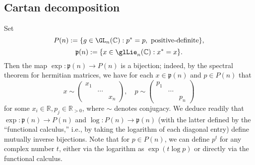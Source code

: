 \documentclass[reqno]{amsart} 
\begin{document}
\subsection{Cartan decomposition}\label{sec:cartan-decomposition}
Set
\begin{equation*}
  P(n) := \{g \in \GL_n(\mathbb{C}) : p^* = p, \text{ positive-definite} \},
\end{equation*}
\begin{equation*}
  \mathfrak{p}(n) := \{x \in \glLie_n(\mathbb{C}) : x^* = x \}.
\end{equation*}
Then the map $\exp : \mathfrak{p}(n) \rightarrow P(n)$ is a bijection; indeed, by the spectral theorem for hermitian matrices, we have for each $x \in \mathfrak{p}(n)$ and $p \in P(n)$ that
\begin{equation*}
  x \sim
  \begin{pmatrix}
    x_1 &  &  \\
    & \dotsb  &  \\
    & & x_n
  \end{pmatrix}
, \quad p \sim
  \begin{pmatrix}
    p_1 &  &  \\
    & \dotsb  &  \\
    & & p_n
  \end{pmatrix}
\end{equation*}
for some $x_i \in \mathbb{R}, p_j \in \mathbb{R}_{>0}$, where $\sim$ denotes conjugacy.  We deduce readily that $\exp : \mathfrak{p}(n) \rightarrow P(n)$ and $\log : P(n) \rightarrow \mathfrak{p}(n)$ (with the latter defined by the ``functional calculus,'' i.e., by taking the logarithm of each diagonal entry) define mutually inverse bijections.  Note that for $p \in P(n)$, we can define $p^t$ for any complex number $t$, either via the logarithm as $\exp(t \log p)$ or directly via the functional calculus.
\end{document}
